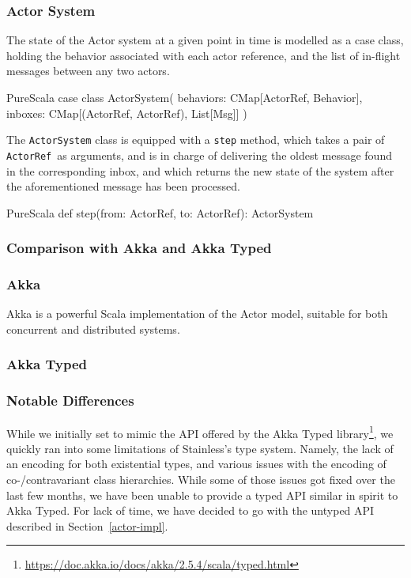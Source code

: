\documentclass[a4paper,twoside]{article}
\newcommand{\InlineS}[1]{\lstinline[language=PureScala,basicstyle=\small\ttfamily,columns=fixed]|#1|}
\newcommand{\RefSec}[1]{Section~\ref{#1}}
\newcommand{\ActorRef}{\InlineS{ActorRef}\ }
\begin{document}
\subsubsection*{Actor System}

The state of the Actor system at a given point in time is modelled as a case class, 
holding the behavior associated with each actor reference, and the list of in-flight messages between any two actors.

\begin{ShortCode}{PureScala}
case class ActorSystem(
  behaviors: CMap[ActorRef, Behavior],
  inboxes: CMap[(ActorRef, ActorRef), List[Msg]]
)
\end{ShortCode}

The \InlineS{ActorSystem} class is equipped with a \InlineS{step} method, which takes 
a pair of \ActorRef as arguments, and is in charge of delivering the oldest message 
found in the corresponding inbox, and which returns the new state of the system after 
the aforementioned message has been processed.

\begin{ShortCode}{PureScala}
def step(from: ActorRef, to: ActorRef): ActorSystem
\end{ShortCode}

\subsubsection{Comparison with Akka and Akka Typed}

\subsubsection*{Akka}

Akka is a powerful Scala implementation of the Actor model, suitable for both concurrent and distributed systems. 

\subsubsection*{Akka Typed}

\subsubsection*{Notable Differences}

While we initially set to mimic the API offered by the Akka Typed library\footnote{\url{https://doc.akka.io/docs/akka/2.5.4/scala/typed.html}}, we quickly ran into some limitations of Stainless's type system. Namely, the lack of an encoding for both existential types, and various issues with the encoding of co-/contravariant class hierarchies. While some of those issues got fixed over the last few months, we have been unable to provide a typed API similar in spirit to Akka Typed. For lack of time, we have decided to go with the untyped API described in \RefSec{actor-impl}.\\
\end{document}
